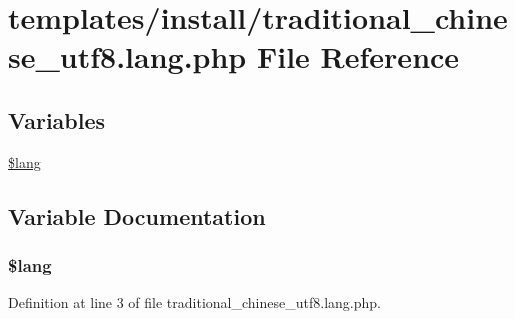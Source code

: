 \hypertarget{templates_2install_2traditional__chinese__utf8_8lang_8php}{\section{templates/install/traditional\+\_\+chinese\+\_\+utf8.lang.\+php File Reference}
\label{templates_2install_2traditional__chinese__utf8_8lang_8php}
}
\subsection*{Variables}
\begin{DoxyCompactItemize}
\item 
\hyperlink{templates_2install_2traditional__chinese__utf8_8lang_8php_a7714b111b644017933931ec69a154102}{\$lang}
\end{DoxyCompactItemize}


\subsection{Variable Documentation}
\hypertarget{templates_2install_2traditional__chinese__utf8_8lang_8php_a7714b111b644017933931ec69a154102}{
\subsubsection[{\$lang}]{\setlength{\rightskip}{0pt plus 5cm}\$lang}}\label{templates_2install_2traditional__chinese__utf8_8lang_8php_a7714b111b644017933931ec69a154102}


Definition at line 3 of file traditional\+\_\+chinese\+\_\+utf8.\+lang.\+php.

